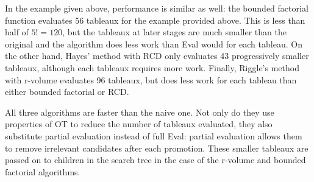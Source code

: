 \documentclass[11pt]{article}
\begin{document}
In the example given above, performance is similar as well: the bounded factorial
function evaluates 56 tableaux for the example provided above. This is
less than half of $5!=120$, but the tableaux at later stages are much
smaller than the original and the algorithm does less work than {\sc
  Eval} would for each tableau. On the other hand, Hayes' method with
RCD only evaluates 43 progressively smaller tableaux, although each
tableaux requires more work. Finally, Riggle's method with r-volume
evaluates 96 tableaux, but does less work for each tableau than either
bounded factorial or RCD.

All three algorithms are faster than the naive one. Not only do they
use properties of OT to reduce the number of tableaux evaluated, they also
substitute partial evaluation instead of full {\sc Eval}: partial
evaluation allows them to remove irrelevant candidates after each
promotion. These smaller tableaux are passed on to children in the
search tree in the case of the r-volume and bounded factorial
algorithms.



\end{document}
